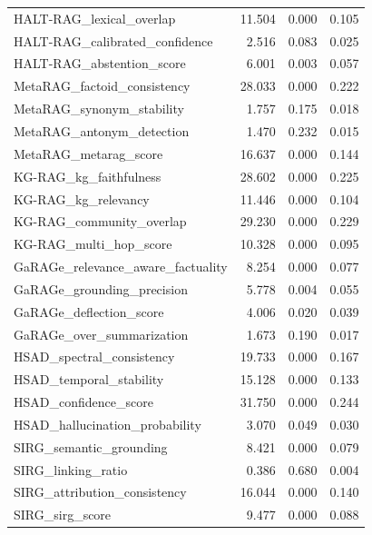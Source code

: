 \begin{table}
\begin{tabular}{lrrr}
HALT-RAG_lexical_overlap & 11.504 & 0.000 & 0.105 \\
HALT-RAG_calibrated_confidence & 2.516 & 0.083 & 0.025 \\
HALT-RAG_abstention_score & 6.001 & 0.003 & 0.057 \\
MetaRAG_factoid_consistency & 28.033 & 0.000 & 0.222 \\
MetaRAG_synonym_stability & 1.757 & 0.175 & 0.018 \\
MetaRAG_antonym_detection & 1.470 & 0.232 & 0.015 \\
MetaRAG_metarag_score & 16.637 & 0.000 & 0.144 \\
KG-RAG_kg_faithfulness & 28.602 & 0.000 & 0.225 \\
KG-RAG_kg_relevancy & 11.446 & 0.000 & 0.104 \\
KG-RAG_community_overlap & 29.230 & 0.000 & 0.229 \\
KG-RAG_multi_hop_score & 10.328 & 0.000 & 0.095 \\
GaRAGe_relevance_aware_factuality & 8.254 & 0.000 & 0.077 \\
GaRAGe_grounding_precision & 5.778 & 0.004 & 0.055 \\
GaRAGe_deflection_score & 4.006 & 0.020 & 0.039 \\
GaRAGe_over_summarization & 1.673 & 0.190 & 0.017 \\
HSAD_spectral_consistency & 19.733 & 0.000 & 0.167 \\
HSAD_temporal_stability & 15.128 & 0.000 & 0.133 \\
HSAD_confidence_score & 31.750 & 0.000 & 0.244 \\
HSAD_hallucination_probability & 3.070 & 0.049 & 0.030 \\
SIRG_semantic_grounding & 8.421 & 0.000 & 0.079 \\
SIRG_linking_ratio & 0.386 & 0.680 & 0.004 \\
SIRG_attribution_consistency & 16.044 & 0.000 & 0.140 \\
SIRG_sirg_score & 9.477 & 0.000 & 0.088 \\
\bottomrule
\end{tabular}
\end{table}


